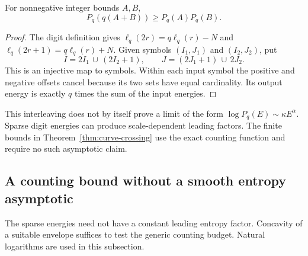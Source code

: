 \begin{lemma}\label{lem:curve-interleaving}
For nonnegative integer bounds $A,B$,
\[
 P_q(q(A+B))\geq P_q(A)P_q(B).
\]
\end{lemma}
\begin{proof}
The digit definition gives
$\ell_q(2r)=q\ell_q(r)-N$ and $\ell_q(2r+1)=q\ell_q(r)+N$.
Given symbols $(I_1,J_1)$ and $(I_2,J_2)$, put
\[
 I=2I_1\,\cup\,(2I_2+1),\qquad
 J=(2J_1+1)\,\cup\,2J_2.
\]
This is an injective map to symbols. Within each input symbol the positive and negative offsets cancel because its two sets have equal cardinality. Its output energy is exactly $q$ times the sum of the input energies.
\end{proof}

This interleaving does not by itself prove a limit of the form $\log P_q(E)\sim\kappa E^\alpha$. Sparse digit energies can produce scale-dependent leading factors. The finite bounds in Theorem~\ref{thm:curve-crossing} use the exact counting function and require no such asymptotic claim.

\subsection{A counting bound without a smooth entropy asymptotic}
The sparse energies need not have a constant leading entropy factor. Concavity of a suitable envelope suffices to test the generic counting budget. Natural logarithms are used in this subsection.

